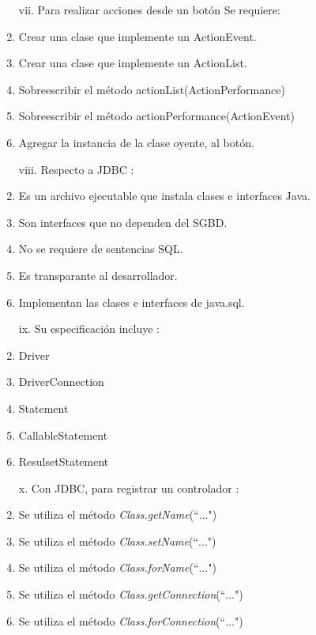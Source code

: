 \documentclass[10pt]{article}
\begin{document}
{\begin{enumerate}
\begin{multicols}{2}
    \begin{enumerate}[label=(\alph*)]
        \item[vii.] Para realizar acciones desde un bot\'on Se requiere:
        \item Crear una clase que implemente un ActionEvent.
        \item Crear una clase que implemente un ActionList.
        \item Sobreescribir el m\'etodo actionList(ActionPerformance)
        \item Sobreescribir el m\'etodo actionPerformance(ActionEvent)
        \item Agregar la instancia de la clase oyente, al bot\'on.
    \end{enumerate}
    
    \begin{enumerate}[label=(\alph*)]
        \item[viii.] Respecto a JDBC : 
        \item Es un archivo ejecutable que instala clases e interfaces Java.
        \item Son interfaces que no dependen del SGBD. 
        \item No se requiere de sentencias SQL.
        \item Es transparante al desarrollador.
        \item Implementan las clases e interfaces de java.sql.
    \end{enumerate}

    \begin{enumerate}[label=(\alph*)]
        \item[ix.] Su especificaci\'on incluye : 
        \item Driver
        \item DriverConnection
        \item Statement
        \item CallableStatement
        \item ResulsetStatement
    \end{enumerate}
    
    \begin{enumerate}[label=(\alph*)]
        \item[x.] Con JDBC, para registrar un controlador : 
        \item Se utiliza el m\'etodo \emph{Class.getName}(``$\ldots$")
        \item Se utiliza el m\'etodo \emph{Class.setName}(``$\ldots$")
        \item Se utiliza el m\'etodo \emph{Class.forName}(``$\ldots$")
        \item Se utiliza el m\'etodo \emph{Class.getConnection}(``$\ldots$")
        \item Se utiliza el m\'etodo \emph{Class.forConnection}(``$\ldots$")
    \end{enumerate}


\end{multicols}
\end{enumerate}}
\end{document}
